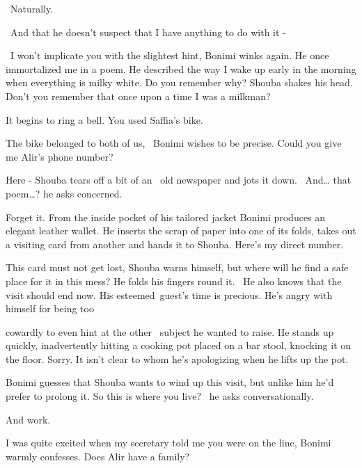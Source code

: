 \documentclass[letterpaper]{article}
\begin{document}
~{\textquotedbl}Naturally.{\textquotedbl}

~{\textquotedbl}And that he doesn't suspect that I have anything to do with it -{\textquotedbl}

~{\textquotedbl}I won't implicate you with the slightest hint,{\textquotedbl} Bonimi winks again. {\textquotedbl}He once
immortalized me in a poem. He described the way I wake up early in the morning when everything is milky white. Do you
remember why?{\textquotedbl} Shouba shakes his head. {\textquotedbl}Don't you remember that once upon a time I was a
milkman?{\textquotedbl}

{\textquotedbl}It begins to ring a bell. You used Saffia's bike.{\textquotedbl}

{\textquotedbl}The bike belonged to both of us,{\textquotedbl} \ Bonimi wishes to be precise. {\textquotedbl}Could you
give me Alir's phone number?{\textquotedbl}

{\textquotedbl}Here -{\textquotedbl} Shouba tears off {a bit of an \ }old newspaper and jots it down.
\ {\textquotedbl}And{\dots} that poem{\dots}?{\textquotedbl} he asks concerned.

{\textquotedbl}Forget it.{\textquotedbl} From the inside pocket of his tailored jacket Bonimi produces an elegant
leather wallet. He inserts the scrap of paper into one of its folds, takes out a visiting card from another and hands
it to Shouba. {\textquotedbl}Here's my direct number.{\textquotedbl}

This card must not get lost, Shouba warns himself, but where will he find a safe place for it in this mess? He folds his
fingers round it. \ He also knows that the visit should end now. His esteemed~guest's time is precious.
He's{ }angry with himself for being too 

cowardly to even hint at the other \ subject he wanted to raise. He stands up quickly, inadvertently hitting a cooking
pot placed on a bar stool, knocking it on the floor. {\textquotedbl}Sorry.{\textquotedbl} It isn't clear to whom he's
apologizing when he lifts up the pot.

Bonimi guesses that Shouba wants to wind up this visit, but unlike him he'd prefer to prolong it. {\textquotedbl}So this
is where you live?{\textquotedbl} \ he asks conversationally. 

{\textquotedbl}And work.{\textquotedbl}

{\textquotedbl}I was quite excited when my secretary told me you were on the line,{\textquotedbl} Bonimi warmly
confesses. {\textquotedbl}Does Alir have a family?{\textquotedbl}
\end{document}
